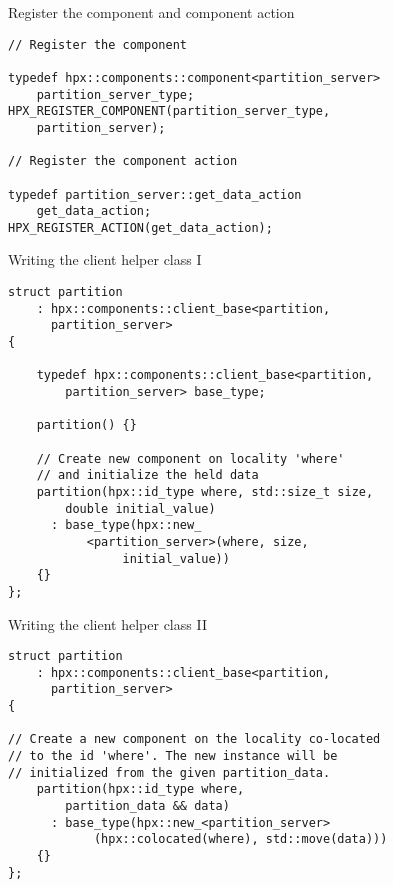 \documentclass[12pt,t]{beamer}
\begin{document}
\begin{frame}[fragile]{Register the component and component action}

\begin{lstlisting}
// Register the component

typedef hpx::components::component<partition_server> 
    partition_server_type;
HPX_REGISTER_COMPONENT(partition_server_type, 
    partition_server);

// Register the component action

typedef partition_server::get_data_action
    get_data_action;
HPX_REGISTER_ACTION(get_data_action);
\end{lstlisting}

\end{frame}


\begin{frame}[fragile]{Writing the client helper class I}

\begin{lstlisting}
struct partition 
	: hpx::components::client_base<partition, 
	  partition_server>
{

    typedef hpx::components::client_base<partition, 
        partition_server> base_type;
        
    partition() {}

    // Create new component on locality 'where' 
    // and initialize the held data
    partition(hpx::id_type where, std::size_t size, 
        double initial_value)
      : base_type(hpx::new_
           <partition_server>(where, size, 
                initial_value))
    {}
};
\end{lstlisting}

\end{frame}

\begin{frame}[fragile]{Writing the client helper class II}

\begin{lstlisting}
struct partition 
	: hpx::components::client_base<partition, 
	  partition_server>
{

// Create a new component on the locality co-located 
// to the id 'where'. The new instance will be 
// initialized from the given partition_data.
    partition(hpx::id_type where, 
        partition_data && data)
      : base_type(hpx::new_<partition_server>
            (hpx::colocated(where), std::move(data)))
    {}
};
\end{lstlisting}

\end{frame}
\end{document}
